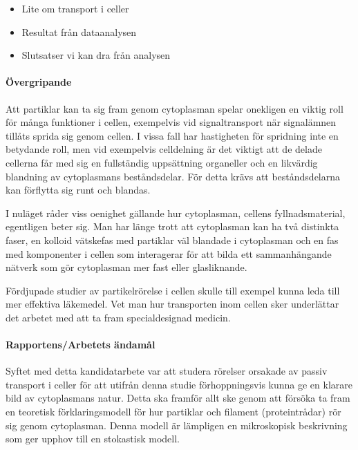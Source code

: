 \begin{itemize}
    \item Lite om transport i celler
    \item Resultat från dataanalysen
    \item Slutsatser vi kan dra från analysen
\end{itemize}



\paragraph{Övergripande}
Att partiklar kan ta sig fram genom cytoplasman spelar onekligen en viktig roll för många funktioner i cellen, exempelvis vid signaltransport när signalämnen tillåts sprida sig genom cellen. I vissa fall har hastigheten för spridning inte en betydande roll, men vid exempelvis celldelning är det viktigt att de delade cellerna får med sig en fullständig uppsättning organeller och en likvärdig blandning av cytoplasmans beståndsdelar. För detta krävs att beståndsdelarna kan förflytta sig runt och blandas.

I nuläget råder viss oenighet gällande hur cytoplasman, cellens fyllnadsmaterial, egentligen beter sig. Man har länge trott att cytoplasman kan ha två distinkta faser, en kolloid vätskefas med partiklar väl blandade i cytoplasman och en fas med komponenter i cellen som interagerar för att bilda ett sammanhängande nätverk som gör cytoplasman mer fast eller glasliknande.

Fördjupade studier av partikelrörelse i cellen skulle till exempel kunna leda till mer effektiva läkemedel. Vet man hur transporten inom cellen sker underlättar det arbetet med att ta fram specialdesignad medicin.


\paragraph{Rapportens/Arbetets ändamål}
Syftet med detta kandidatarbete var att studera rörelser orsakade av passiv transport i celler för att utifrån denna studie förhoppningsvis kunna ge en klarare bild av cytoplasmans natur. Detta ska framför allt ske genom att försöka ta fram en teoretisk förklaringsmodell för hur partiklar och filament (proteintrådar) rör sig genom cytoplasman. 
Denna modell är lämpligen en mikroskopisk beskrivning som ger upphov till en stokastisk modell. 

